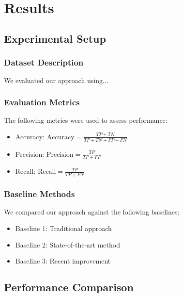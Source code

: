 \section{Results}
\label{sec:results}


\subsection{Experimental Setup}

\subsubsection{Dataset Description}
We evaluated our approach using...

\subsubsection{Evaluation Metrics}
The following metrics were used to assess performance:
\begin{itemize}
    \item Accuracy: $\text{Accuracy} = \frac{TP + TN}{TP + TN + FP + FN}$
    \item Precision: $\text{Precision} = \frac{TP}{TP + FP}$
    \item Recall: $\text{Recall} = \frac{TP}{TP + FN}$
\end{itemize}

\subsubsection{Baseline Methods}
We compared our approach against the following baselines:
\begin{itemize}
    \item Baseline 1: Traditional approach \cite{ref1}
    \item Baseline 2: State-of-the-art method \cite{ref2}
    \item Baseline 3: Recent improvement \cite{ref3}
\end{itemize}

\subsection{Performance Comparison}

